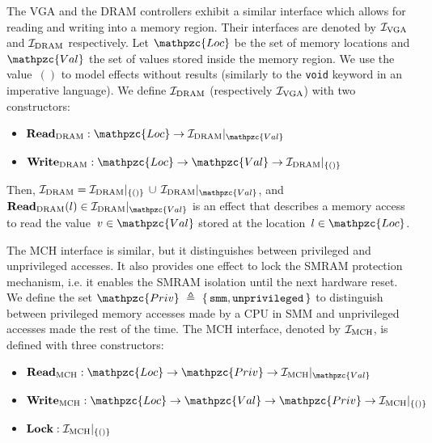 \begin{example}
  The VGA and the DRAM controllers exhibit a similar interface which allows for
  reading and writing into a memory region.
  Their interfaces are denoted by $\mathcal{I}_{\mathrm{VGA}}$ and $\mathcal{I}_{\mathrm{DRAM}}$
  respectively.
  Let $\mathpzc{Loc}$ be the set of memory locations and $\mathpzc{Val}$ the
  set of values stored inside the memory region.
  We use the value~$()$ to model effects without results (similarly to
  the \texttt{void} keyword in an imperative language).
  We define $\mathcal{I}_{\mathrm{DRAM}}$ (respectively $\mathcal{I}_{\mathrm{VGA}}$) with two constructors:
  \begin{itemize}
  \item
    $\func{Read}_{\mathrm{DRAM}} : \mathpzc{Loc} \rightarrow
    \Interface{\I_{\mathrm{DRAM}}}{\mathpzc{Val}}$
  \item
    $\func{Write}_{\mathrm{DRAM}} : \mathpzc{Loc} \rightarrow \mathpzc{Val}
    \rightarrow \Interface{\I_{\mathrm{DRAM}}}{\{()\}}$
  \end{itemize}

  Then, $\I_{\mathrm{DRAM}} =
  \Interface{\I_{\mathrm{DRAM}}}{\{()\}}\,\cup\,\Interface{\I_{\mathrm{DRAM}}}{\mathpzc{Val}}$,
  and
  $\func{Read}_{\mathrm{DRAM}}(l) \in
  \Interface{\I_{\mathrm{DRAM}}}{\mathpzc{Val}}$ is an effect that describes a
  memory access to read the value~$v \in \mathpzc{Val}$ stored at the
  location~$l \in \mathpzc{Loc}$.

  The MCH interface is similar, but it distinguishes between privileged and
  unprivileged accesses.
  It also provides one effect to lock the SMRAM protection mechanism, i.e. it
  enables the SMRAM isolation until the next hardware reset.
  We define the set $\mathpzc{Priv}~\triangleq~\{\,\val{smm},
  \val{unprivileged}\,\}$ to distinguish between privileged memory accesses
  made by a CPU in SMM and unprivileged accesses made the rest of the time.
  The MCH interface, denoted by $\mathcal{I}_{\mathrm{MCH}}$, is defined with three constructors:
  \begin{itemize}
  \item
    $\func{Read}_{\mathrm{MCH}} : \mathpzc{Loc} \rightarrow \mathpzc{Priv} \rightarrow
    \Interface{\I_{\mathrm{MCH}}}{\mathpzc{Val}}$
  \item
    $\func{Write}_{\mathrm{MCH}} : \mathpzc{Loc} \rightarrow \mathpzc{Val} \rightarrow
    \mathpzc{Priv} \rightarrow \Interface{\I_{\mathrm{MCH}}}{\{()\}}$
  \item $\mathbf{\mathbf{Lock}} : \mathcal{I}_{\mathrm{MCH}}|_{\{()\}}$
  \end{itemize}
\end{example}

